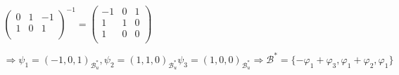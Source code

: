 \documentclass[12pt]{article}
\begin{document}
\begin{ejercicio}[4 puntos]
\begin{enumerate}[label=\alph*.]
\begin{gather*}
\begin{pmatrix}
                0 & 1 & -1 \\
                1 & 0 & 1 \\
            \end{pmatrix}^{-1} = 
            \begin{pmatrix}
                -1 & 0 & 1 \\
                1 & 1 & 0 \\
                1 & 0 & 0 \\
            \end{pmatrix} \\\\
            \Rightarrow \psi_1 = (-1, 0, 1)_{\mathcal{B}_u^*}, \psi_2 = (1, 1, 0)_{\mathcal{B}_u^*} \psi_3 = (1, 0, 0)_{\mathcal{B}_u^*} \Rightarrow \mathcal{B^*} = \{-\varphi_1 + \varphi_3, \varphi_1 + \varphi_2, \varphi_1\}
        \end{gather*}
        \end{enumerate}
    \end{ejercicio}

    
\end{document}

